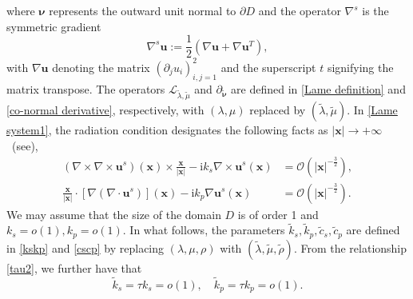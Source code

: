 \documentclass[10pt,reqno,oneside]{amsart}%
\theoremstyle{definition}
\theoremstyle{remark}
\numberwithin{equation}{section}
\numberwithin{equation}{section}
\begin{document}
where $\boldsymbol{\nu}$ represents the outward unit normal to $\partial D$ and the operator $\nabla^{s}$ is the symmetric gradient
\begin{equation}
\nabla^{s} \mathbf{u}:=\frac{1}{2}\left(\nabla \mathbf{u}+\nabla \mathbf{u}^{T}\right),
\end{equation}
with $\nabla \mathbf{u}$ denoting the matrix $\left(\partial_{j} u_{i}\right)_{i, j=1}^{2}$ and the superscript $t$ signifying the matrix transpose. The operators $\mathcal{L}_{\tilde{\lambda}, \tilde{\mu}}$ and $\partial_{\tilde{\boldsymbol{\nu}}}$ are defined in \eqref{Lame definition} and \eqref{co-normal derivative}, respectively, with $(\lambda, \mu)$ replaced by $(\tilde{\lambda}, \tilde{\mu})$. In \eqref{Lame system1}, the radiation condition designates the following facts as $|\mathbf{x}| \rightarrow+\infty$~(see\cite{HAmmariElasticityImaging}),
\begin{equation}
\begin{aligned}
\left(\nabla \times \nabla \times \mathbf{u}^{s}\right)(\mathbf{x}) \times \frac{\mathbf{x}}{|\mathbf{x}|}-\mathrm{i} k_{s} \nabla \times \mathbf{u}^{s}(\mathbf{x}) & =\mathcal{O}\left(|\mathbf{x}|^{-\frac{3}{2}}\right), \\
\frac{\mathbf{x}}{|\mathbf{x}|} \cdot\left[\nabla\left(\nabla \cdot \mathbf{u}^{s}\right)\right](\mathbf{x})-\mathrm{i} k_{p} \nabla \mathbf{u}^{s}(\mathbf{x}) & =\mathcal{O}\left(|\mathbf{x}|^{-\frac{3}{2}}\right).
\end{aligned}
\end{equation}
We may assume that the size of the domain $D$ is of order 1 and $k_{s}=o(1), k_{p}=o(1)$. In what follows, the parameters $\tilde{k}_{s}, \tilde{k}_{p}, \tilde{c}_{s}, \tilde{c}_{p}$ are defined in \eqref{kskp} and \eqref{cscp} by replacing $(\lambda, \mu, \rho)$ with $(\tilde{\lambda}, \tilde{\mu}, \tilde{\rho})$. From the relationship \eqref{tau2}, we further have that
\begin{equation}
\tilde{k}_{s}=\tau k_{s}=o(1), \quad \tilde{k}_{p}=\tau k_{p}=o(1) .
\end{equation}
\end{document}
